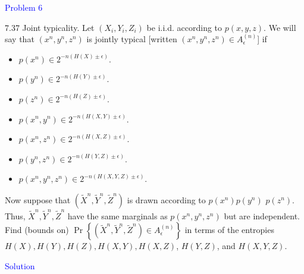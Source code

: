 \textcolor{blue}{Problem 6}

7.37 Joint typicality. Let $\left(X_i, Y_i, Z_i\right)$ be i.i.d. according to $p(x, y, z)$. We will say that $\left(x^n, y^n, z^n\right)$ is jointly typical [written $\left(x^n, y^n, z^n\right) \in A_\epsilon^{(n)}$] if
\begin{itemize}
\item $p\left(x^n\right) \in 2^{-n(H(X) \pm \epsilon)}$.
\item $p\left(y^n\right) \in 2^{-n(H(Y) \pm \epsilon)}$.
\item $p\left(z^n\right) \in 2^{-n(H(Z) \pm \epsilon)}$.
\item $p\left(x^n, y^n\right) \in 2^{-n(H(X, Y) \pm \epsilon)}$.
\item $p\left(x^n, z^n\right) \in 2^{-n(H(X, Z) \pm \epsilon)}$.
\item $p\left(y^n, z^n\right) \in 2^{-n(H(Y, Z) \pm \epsilon)}$.
\item $p\left(x^n, y^n, z^n\right) \in 2^{-n(H(X, Y, Z) \pm \epsilon)}$.
\end{itemize}

Now suppose that $\left(\tilde{X}^n, \tilde{Y}^n, \tilde{Z}^n\right)$ is drawn according to $p\left(x^n\right) p\left(y^n\right)$ $p\left(z^n\right)$. Thus, $\tilde{X}^n, \tilde{Y}^n, \tilde{Z}^n$ have the same marginals as $p\left(x^n, y^n, z^n\right)$ but are independent. Find (bounds on) $\operatorname{Pr}\left\{\left(\tilde{X}^n, \tilde{Y}^n, \tilde{Z}^n\right) \in A_\epsilon^{(n)}\right\}$ in terms of the entropies $H(X), H(Y), H(Z), H(X, Y), H(X, Z)$, $H(Y, Z)$, and $H(X, Y, Z)$.

\textcolor{blue}{Solution}

